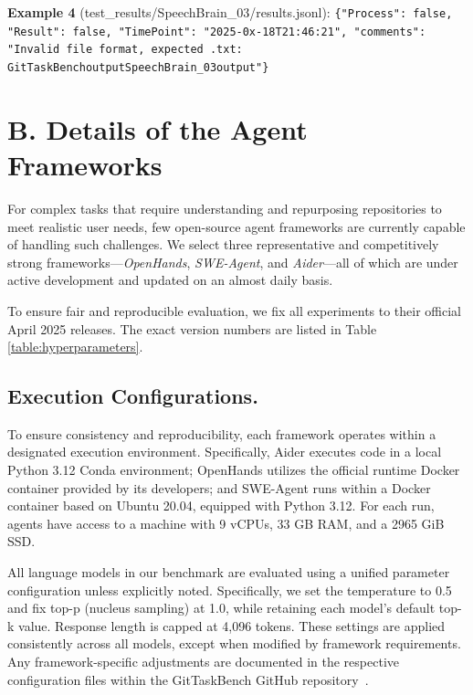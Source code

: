 \noindent \textbf{Example 4} (test\_results/SpeechBrain\_03/results.jsonl):
\texttt{\{"Process": false, "Result": false, "TimePoint": "2025-0x-18T21:46:21", "comments": "Invalid file format, expected .txt: \/GitTaskBench\/output\/SpeechBrain\_03\/output"\}}




\section*{B. Details of the Agent Frameworks}
\label{appendix:framework settings}
For complex tasks that require understanding and repurposing repositories to meet realistic user needs, few open-source agent frameworks are currently capable of handling such challenges. We select three representative and competitively strong frameworks---\textit{OpenHands}, \textit{SWE-Agent}, and \textit{Aider}---all of which are under active development and updated on an almost daily basis.

To ensure fair and reproducible evaluation, we fix all experiments to their official April 2025 releases. The exact version numbers are listed in Table \ref{table:hyperparameters}.

\subsection*{Execution Configurations.} 
To ensure consistency and reproducibility, each framework operates within a designated execution environment. Specifically, Aider executes code in a local Python 3.12 Conda environment; OpenHands utilizes the official runtime Docker container provided by its developers; and SWE-Agent runs within a Docker container based on Ubuntu 20.04, equipped with Python 3.12. For each run, agents have access to a machine with 9 vCPUs, 33 GB RAM, and a 2965 GiB SSD. 

All language models in our benchmark are evaluated using a unified parameter configuration unless explicitly noted. Specifically, we set the temperature to 0.5 and fix top-p (nucleus sampling) at 1.0, while retaining each model's default top-k value. Response length is capped at 4,096 tokens. These settings are applied consistently across all models, except when modified by framework requirements. Any framework-specific adjustments are documented in the respective configuration files within the GitTaskBench GitHub repository~\cite{gittaskbench2025}.


